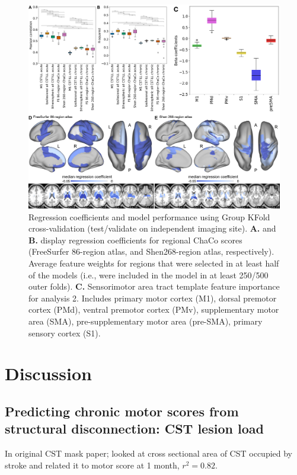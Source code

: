 \documentclass[10pt]{article}
\begin{document}
\begin{figure}[htp]
\centering
\includegraphics[width=1\linewidth]{figures/Analysis6.png}
\caption{Regression coefficients and model performance using Group KFold cross-validation (test/validate on independent imaging site). \textbf{A.} and \textbf{B.} display regression coefficients for regional ChaCo scores (FreeSurfer 86-region atlas, and Shen268-region atlas, respectively). Average feature weights for regions that were selected in at least half of the models (i.e., were included in the model in at least 250/500 outer folds). \textbf{C.} Sensorimotor area tract template feature importance for analysis 2. Includes primary motor cortex (M1), dorsal premotor cortex (PMd), ventral premotor cortex (PMv), supplementary motor area (SMA), pre-supplementary motor area (pre-SMA), primary sensory cortex (S1).}
\label{nemotool}
\end{figure}


\section{Discussion}

\subsection*{Predicting chronic motor scores from structural disconnection: CST lesion load}
In \cite{Pineiro2000-dv} original CST mask paper; looked at cross sectional area of CST occupied by stroke and related it to motor score at 1 month, $r^2 = 0.82$.
\end{document}
